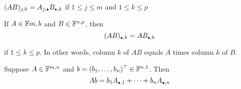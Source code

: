 \setcounter{thm}{45}
\begin{thm} 
  $(AB)_{j,k} = A_{j, \mathsmaller{\bullet}} B_{\mathsmaller{\bullet}, k}$ if $1 \leq j \leq m$ and $1 \leq k \leq p$
\end{thm}

\setcounter{thm}{47}
\begin{thm}
  If $A \in \mathbb{F}{m,b}$ and $B \in \mathbb{F}^{n,p}$, then
  \begin{equation}
    (AB)_{\mathsmaller{\bullet}, k} = AB_{\mathsmaller{\bullet}, k}
  \end{equation}
  
  if $1 \leq k \leq p$. In other words, column $k$ of $AB$ equals $A$ times column $k$ of $B$.
\end{thm}

\setcounter{thm}{49}
\begin{thm}
  Suppose $A \in \mathbb{F}^{m,n}$ and  $b = (b_1, \ldots, b_n)^{\top}\in \mathbb{F}^{n,1}$. Then 
  \begin{equation}
    Ab = b_1 A_{\mathsmaller{\bullet}, 1} + \dots + b_n A_{\mathsmaller{\bullet},n}
  \end{equation}
\end{thm}

